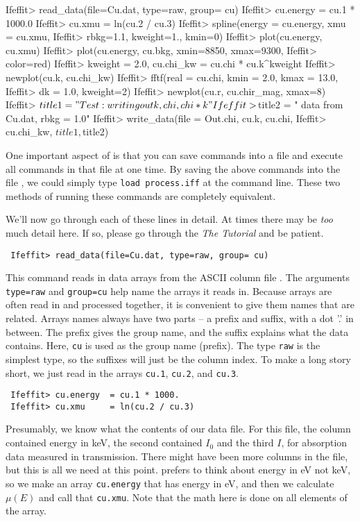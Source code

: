 {\small{
\begin{VerbSBox}
 Ifeffit> read_data(file=Cu.dat, type=raw, group= cu)
 Ifeffit> cu.energy  = cu.1 * 1000.0
 Ifeffit> cu.xmu     = ln(cu.2 / cu.3)
 Ifeffit> spline(energy = cu.energy, xmu = cu.xmu, 
 Ifeffit>        rbkg=1.1, kweight=1., kmin=0)
 Ifeffit> plot(cu.energy, cu.xmu)
 Ifeffit> plot(cu.energy, cu.bkg, xmin=8850, xmax=9300,  
 Ifeffit>                         color=red)
 Ifeffit> kweight = 2.0,  cu.chi_kw = cu.chi * cu.k^kweight
 Ifeffit> newplot(cu.k,  cu.chi_kw)
 Ifeffit> fftf(real = cu.chi, kmin = 2.0, kmax = 13.0, 
 Ifeffit>      dk = 1.0, kweight=2)
 Ifeffit> newplot(cu.r, cu.chir_mag, xmax=8)
 Ifeffit> $title1 = "Test: writing out  k, chi, chi*k"
 Ifeffit> $title2 = "   data from Cu.dat,   rbkg = 1.0"
 Ifeffit> write_data(file = Out.chi,  cu.k, cu.chi, 
 Ifeffit>            cu.chi_kw, $title1, $title2)
\end{VerbSBox}
}}\noindent 

One important aspect of {\ifeffit} is that you can save commands into a
file and execute all commands in that file at one time.  By saving the
above commands into the file {}, we could simply type
{\tt{load process.iff}} at the {\ifeffit} command line.  These two methods
of running these commands are completely equivalent.

We'll now go through each of these lines in detail.  At times there may be
{\emph{too}} much detail here.  If so, please go through the {\textsl{The
    {\ifeffit} Tutorial}} and be patient.

\begin{verbatim}
 Ifeffit> read_data(file=Cu.dat, type=raw, group= cu)
\end{verbatim}
\noindent
This command reads in data arrays from the ASCII column file
{}.  The arguments {\tt{type=raw}} and {\tt{group=cu}} help
{} name the arrays it reads in.  Because arrays are often
read in and processed together, it is convenient to give them names that
are related.  Arrays names always have two parts -- a prefix and suffix,
with a dot '.' in between.  The prefix gives the group name, and the suffix
explains what the data contains.  Here, {\tt{cu}} is used as the group name
(prefix).  The type {\tt{raw}} is the simplest type, so the suffixes will
just be the column index.  To make a long story short, we just read in the
arrays {\tt{cu.1}}, {\tt{cu.2}}, and {\tt{cu.3}}.

\begin{verbatim}
 Ifeffit> cu.energy  = cu.1 * 1000.
 Ifeffit> cu.xmu     = ln(cu.2 / cu.3)
\end{verbatim}
\noindent
Presumably, we know what the contents of our data file. For this
{} file, the column contained energy in keV, the second
contained $I_0$ and the third $I$, for absorption data measured in
transmission.  There might have been more columns in the file, but this is
all we need at this point. {\ifeffit} prefers to think about energy in eV
not keV, so we make an array {\tt{cu.energy}} that has energy in eV, and
then we calculate $\mu(E)$ and call that {\tt{cu.xmu}}.  Note
that the math here is done on all elements of the array.

